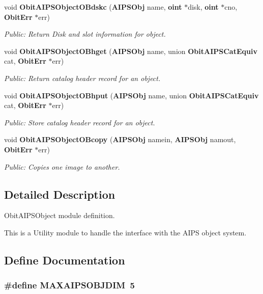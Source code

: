\begin{CompactItemize}
void {\bf Obit\-AIPSObject\-OBdskc} ({\bf AIPSObj} name, {\bf oint} $\ast$disk, {\bf oint} $\ast$cno, {\bf Obit\-Err} $\ast$err)
\begin{CompactList}\small\item\em Public: Return Disk and slot information for object. \item\end{CompactList}\item 
void {\bf Obit\-AIPSObject\-OBhget} ({\bf AIPSObj} name, union {\bf Obit\-AIPSCat\-Equiv} cat, {\bf Obit\-Err} $\ast$err)
\begin{CompactList}\small\item\em Public: Return catalog header record for an object. \item\end{CompactList}\item 
void {\bf Obit\-AIPSObject\-OBhput} ({\bf AIPSObj} name, union {\bf Obit\-AIPSCat\-Equiv} cat, {\bf Obit\-Err} $\ast$err)
\begin{CompactList}\small\item\em Public: Store catalog header record for an object. \item\end{CompactList}\item 
void {\bf Obit\-AIPSObject\-OBcopy} ({\bf AIPSObj} namein, {\bf AIPSObj} namout, {\bf Obit\-Err} $\ast$err)
\begin{CompactList}\small\item\em Public: Copies one image to another. \item\end{CompactList}\end{CompactItemize}


\subsection{Detailed Description}
Obit\-AIPSObject module definition. 

This is a Utility module to handle the interface with the AIPS object system.

\subsection{Define Documentation}
\subsubsection{\setlength{\rightskip}{0pt plus 5cm}\#define MAXAIPSOBJDIM\ 5}\label{ObitAIPSObject_8h_a0}


